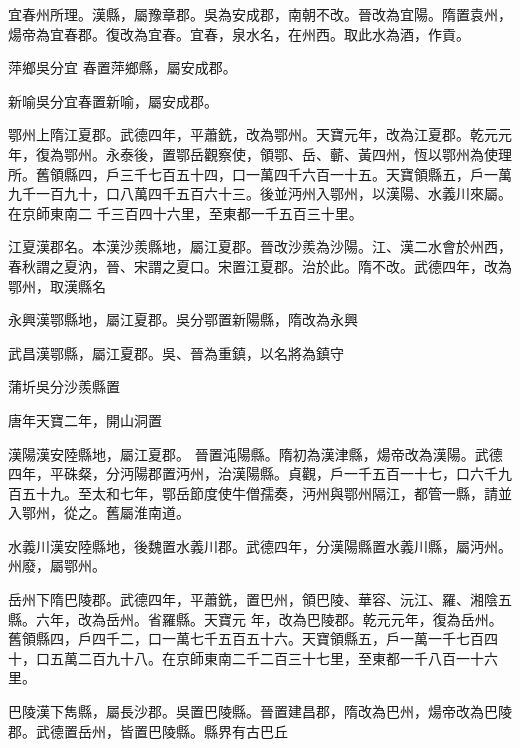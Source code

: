 \begin{pinyinscope}
 宜春州所理。漢縣，屬豫章郡。吳為安成郡，南朝不改。晉改為宜陽。隋置袁州，煬帝為宜春郡。復改為宜春。宜春，泉水名，在州西。取此水為酒，作貢。



 萍鄉吳分宜
 春置萍鄉縣，屬安成郡。



 新喻吳分宜春置新喻，屬安成郡。



 鄂州上隋江夏郡。武德四年，平蕭銑，改為鄂州。天寶元年，改為江夏郡。乾元元年，復為鄂州。永泰後，置鄂岳觀察使，領鄂、岳、蘄、黃四州，恆以鄂州為使理所。舊領縣四，戶三千七百五十四，口一萬四千六百一十五。天寶領縣五，戶一萬九千一百九十，口八萬四千五百六十三。後並沔州入鄂州，以漢陽、水義川來屬。在京師東南二
 千三百四十六里，至東都一千五百三十里。



 江夏漢郡名。本漢沙羨縣地，屬江夏郡。晉改沙羨為沙陽。江、漢二水會於州西，春秋謂之夏汭，晉、宋謂之夏口。宋置江夏郡。治於此。隋不改。武德四年，改為鄂州，取漢縣名



 永興漢鄂縣地，屬江夏郡。吳分鄂置新陽縣，隋改為永興



 武昌漢鄂縣，屬江夏郡。吳、晉為重鎮，以名將為鎮守



 蒲圻吳分沙羨縣置



 唐年天寶二年，開山洞置



 漢陽漢安陸縣地，屬江夏郡。
 晉置沌陽縣。隋初為漢津縣，煬帝改為漢陽。武德四年，平硃粲，分沔陽郡置沔州，治漢陽縣。貞觀，戶一千五百一十七，口六千九百五十九。至太和七年，鄂岳節度使牛僧孺奏，沔州與鄂州隔江，都管一縣，請並入鄂州，從之。舊屬淮南道。



 水義川漢安陸縣地，後魏置水義川郡。武德四年，分漢陽縣置水義川縣，屬沔州。州廢，屬鄂州。



 岳州下隋巴陵郡。武德四年，平蕭銑，置巴州，領巴陵、華容、沅江、羅、湘陰五縣。六年，改為岳州。省羅縣。天寶元
 年，改為巴陵郡。乾元元年，復為岳州。舊領縣四，戶四千二，口一萬七千五百五十六。天寶領縣五，戶一萬一千七百四十，口五萬二百九十八。在京師東南二千二百三十七里，至東都一千八百一十六里。



 巴陵漢下雋縣，屬長沙郡。吳置巴陵縣。晉置建昌郡，隋改為巴州，煬帝改為巴陵郡。武德置岳州，皆置巴陵縣。縣界有古巴丘




\end{pinyinscope}
